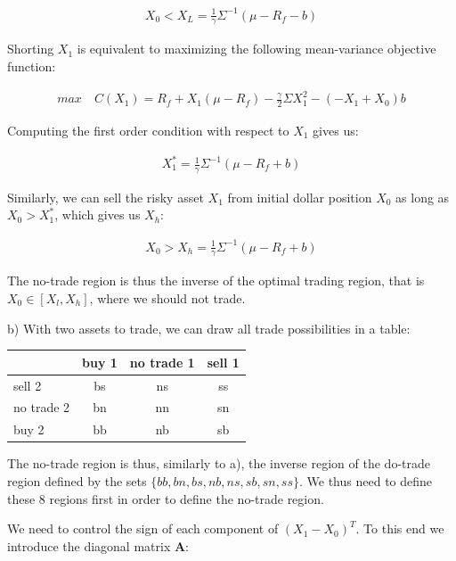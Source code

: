 \documentclass[10pt]{article}
\begin{document}
\begin{align*}
	X_0 < X_L = \frac{1}{\gamma} \Sigma^{-1} (\mu - R_f  - b)
\end{align*}

Shorting $X_1$ is equivalent to maximizing the following mean-variance objective function:

\begin{align*}
	max \quad C(X_1) = R_f + X_1(\mu - R_f) - \frac{\gamma}{2} \Sigma X_1^2 - (-X_1 + X_0)b
\end{align*}

Computing the first order condition with respect to $X_1$ gives us:

\begin{align*}
	X_1^* =\frac{1}{\gamma} \Sigma^{-1} (\mu - R_f + b)
\end{align*}

Similarly, we can sell the risky asset $X_1$ from initial dollar position $X_0$ as long as $X_0 > X_1^*$, which gives us $X_h$:

\begin{align*}
	X_0 > X_h = \frac{1}{\gamma} \Sigma^{-1} (\mu - R_f + b)
\end{align*}

The no-trade region is thus the inverse of the optimal trading region, that is $X_0 \in [X_l, X_h]$, where we should not trade.

\bigbreak

b) With two assets to trade, we can draw all trade possibilities in a table:

\begin{center}
\begin{tabular}{|l|c|c|c|}
\hline
           & \multicolumn{1}{l|}{buy 1} & \multicolumn{1}{l|}{no trade 1} & \multicolumn{1}{l|}{sell 1} \\ \hline
sell 2      & bs  & ns & ss \\ \hline
no trade 2 & bn  & nn & sn \\ \hline
buy 2     & bb & nb & sb  \\ \hline
\end{tabular}
\end{center}

The no-trade region is thus, similarly to a), the inverse region of the do-trade region defined by the sets $\{bb, bn, bs, nb, ns, sb, sn, ss\}$. We thus need to define these 8 regions first in order to define the no-trade region.

\smallbreak

We need to control the sign of each component of $(X_1 - X_0)^T$. To this end we introduce the diagonal matrix \textbf{A}:
\end{document}

